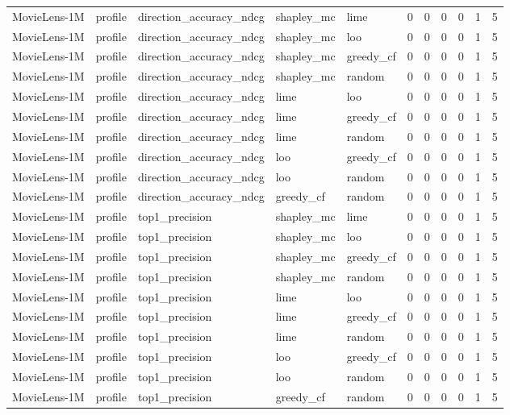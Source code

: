 \begin{table}[t]
{\begin{tabular}{lllllrrrrrr}
MovieLens-1M & profile & direction\_accuracy\_ndcg & shapley\_mc & lime & 0 & 0 & 0 & 0 & 1 & 5 \\
MovieLens-1M & profile & direction\_accuracy\_ndcg & shapley\_mc & loo & 0 & 0 & 0 & 0 & 1 & 5 \\
MovieLens-1M & profile & direction\_accuracy\_ndcg & shapley\_mc & greedy\_cf & 0 & 0 & 0 & 0 & 1 & 5 \\
MovieLens-1M & profile & direction\_accuracy\_ndcg & shapley\_mc & random & 0 & 0 & 0 & 0 & 1 & 5 \\
MovieLens-1M & profile & direction\_accuracy\_ndcg & lime & loo & 0 & 0 & 0 & 0 & 1 & 5 \\
MovieLens-1M & profile & direction\_accuracy\_ndcg & lime & greedy\_cf & 0 & 0 & 0 & 0 & 1 & 5 \\
MovieLens-1M & profile & direction\_accuracy\_ndcg & lime & random & 0 & 0 & 0 & 0 & 1 & 5 \\
MovieLens-1M & profile & direction\_accuracy\_ndcg & loo & greedy\_cf & 0 & 0 & 0 & 0 & 1 & 5 \\
MovieLens-1M & profile & direction\_accuracy\_ndcg & loo & random & 0 & 0 & 0 & 0 & 1 & 5 \\
MovieLens-1M & profile & direction\_accuracy\_ndcg & greedy\_cf & random & 0 & 0 & 0 & 0 & 1 & 5 \\
MovieLens-1M & profile & top1\_precision & shapley\_mc & lime & 0 & 0 & 0 & 0 & 1 & 5 \\
MovieLens-1M & profile & top1\_precision & shapley\_mc & loo & 0 & 0 & 0 & 0 & 1 & 5 \\
MovieLens-1M & profile & top1\_precision & shapley\_mc & greedy\_cf & 0 & 0 & 0 & 0 & 1 & 5 \\
MovieLens-1M & profile & top1\_precision & shapley\_mc & random & 0 & 0 & 0 & 0 & 1 & 5 \\
MovieLens-1M & profile & top1\_precision & lime & loo & 0 & 0 & 0 & 0 & 1 & 5 \\
MovieLens-1M & profile & top1\_precision & lime & greedy\_cf & 0 & 0 & 0 & 0 & 1 & 5 \\
MovieLens-1M & profile & top1\_precision & lime & random & 0 & 0 & 0 & 0 & 1 & 5 \\
MovieLens-1M & profile & top1\_precision & loo & greedy\_cf & 0 & 0 & 0 & 0 & 1 & 5 \\
MovieLens-1M & profile & top1\_precision & loo & random & 0 & 0 & 0 & 0 & 1 & 5 \\
MovieLens-1M & profile & top1\_precision & greedy\_cf & random & 0 & 0 & 0 & 0 & 1 & 5 \\

\end{tabular}}
\end{table}
